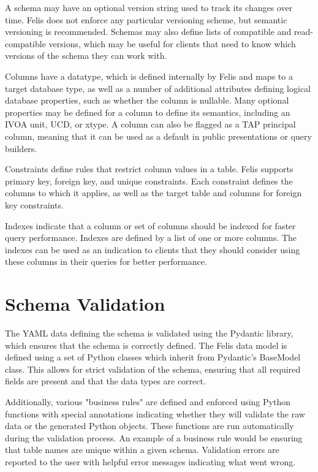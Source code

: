 \documentclass[11pt,twoside]{article}
\begin{document}
A schema may have an optional version string used to track its changes over time.
Felis does not enforce any particular versioning scheme, but semantic versioning is recommended.
Schemas may also define lists of compatible and read-compatible versions, which may be useful for clients that need to know which versions of the schema they can work with.

Columns have a datatype, which is defined internally by Felis and maps to a target database type, as well as a number of additional attributes defining logical database properties, such as whether the column is nullable.
Many optional properties may be defined for a column to define its semantics, including an IVOA unit, UCD, or xtype.
A column can also be flagged as a TAP principal column, meaning that it can be used as a default in public presentations or query builders.

Constraints define rules that restrict column values in a table.
Felis supports primary key, foreign key, and unique constraints.
Each constraint defines the columns to which it applies, as well as the target table and columns for foreign key constraints.

Indexes indicate that a column or set of columns should be indexed for faster query performance.
Indexes are defined by a list of one or more columns.
The indexes can be used as an indication to clients that they should consider using these columns in their queries for better performance.

\section{Schema Validation}

The YAML data defining the schema is validated using the Pydantic library, which ensures that the schema is correctly defined.
The Felis data model is defined using a set of Python classes which inherit from Pydantic's BaseModel class.
This allows for strict validation of the schema, ensuring that all required fields are present and that the data types are correct.

Additionally, various "business rules" are defined and enforced using Python functions with special annotations indicating whether they will validate the raw data or the generated Python objects.
These functions are run automatically during the validation process.
An example of a business rule would be ensuring that table names are unique within a given schema.
Validation errors are reported to the user with helpful error messages indicating what went wrong.
\end{document}
